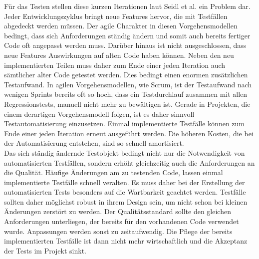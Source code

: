Für das Testen stellen diese kurzen Iterationen laut  Seidl et al. \cite[vgl. S.24]{seidl_basiswissen_2012} ein Problem dar.
Jeder Entwicklungszyklus bringt neue Features hervor, die mit Testfällen abgedeckt werden müssen. Der agile Charakter in diesen Vorgehensmodellen bedingt, dass sich Anforderungen ständig ändern und somit auch bereits fertiger Code oft angepasst werden muss. Darüber hinaus ist nicht ausgeschlossen, dass neue Features Auswirkungen auf alten Code haben können. Neben den neu implementierten Teilen muss daher zum Ende einer jeden Iteration auch sämtlicher alter Code getestet werden.
Dies bedingt einen enormen zusätzlichen Testaufwand. 
In agilen Vorgehensmodellen, wie Scrum, ist der Testaufwand nach wenigen Sprints bereits oft so hoch, dass ein Testdurchlauf zusammen mit allen Regressionstests, manuell nicht mehr zu bewältigen ist.
Gerade in Projekten, die einem derartigen Vorgehensmodell folgen, ist es daher sinnvoll Testautomatisierung einzusetzen. Einmal implementierte Testfälle können zum Ende einer jeden Iteration erneut ausgeführt werden. Die höheren Kosten, die bei der Automatisierung entstehen, sind so schnell amortisiert.\\
Das sich ständig ändernde Testobjekt bedingt nicht nur die Notwendigkeit von automatisierten Testfällen, sondern erhöht gleichzeitig auch die Anforderungen an die Qualität. Häufige Änderungen am zu testenden Code, lassen einmal implementierte Testfälle schnell veralten. Es muss daher bei der Erstellung der automatisierten Tests besonders auf die Wartbarkeit geachtet werden.
Testfälle sollten daher möglichst robust in ihrem Design sein, um nicht schon bei kleinen Änderungen zerstört zu werden. Der Qualitätsstandard sollte den gleichen Anforderungen unterliegen, der bereits für den vorhandenen Code verwendet wurde. Anpassungen werden sonst zu zeitaufwendig. Die Pflege der bereits implementierten Testfälle ist dann nicht mehr wirtschaftlich und die Akzeptanz der Tests im Projekt sinkt.
